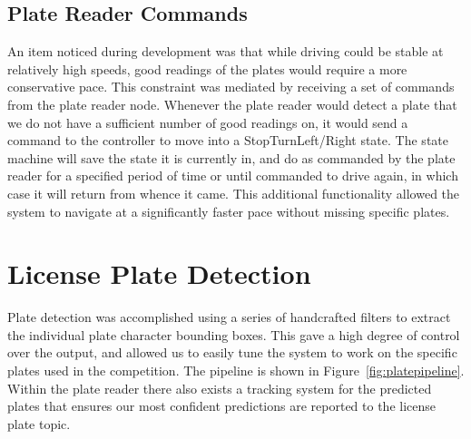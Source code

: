 \documentclass[titlepage, twocolumn]{article}
\begin{document}
    \subsection{Plate Reader Commands} \label{platereadercontrol}

    An item noticed during development was that while driving could be stable at relatively high speeds, good readings of the plates would require a more conservative pace. This constraint was mediated by receiving a set of commands from the plate reader node. Whenever the plate reader would detect a plate that we do not have a sufficient number of good readings on, it would send a command to the controller to move into a StopTurn{Left/Right} state. The state machine will save the state it is currently in, and do as commanded by the plate reader for a specified period of time or until commanded to drive again, in which case it will return from whence it came. This additional functionality allowed the system to navigate at a significantly faster pace without missing specific plates.


\section{License Plate Detection}

Plate detection was accomplished using a series of handcrafted filters to extract the individual plate character bounding boxes. This gave a high degree of control over the output, and allowed us to easily tune the system to work on the specific plates used in the competition. The pipeline is shown in Figure~\ref{fig:platepipeline}. Within the plate reader there also exists a tracking system for the predicted plates that ensures our most confident predictions are reported to the license plate topic.
\end{document}
